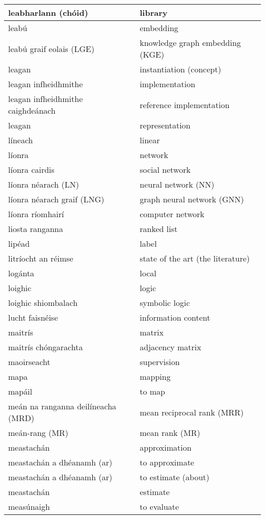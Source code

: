 \begin{longtable}{|l|l|}
		leabharlann (chóid)&library\\ \hline 
		leabú&embedding\\ \hline 
		leabú graif eolais (LGE)&knowledge graph embedding (KGE)\\ \hline 
		leagan&instantiation (concept)\\ \hline 
		leagan infheidhmithe&implementation\\ \hline 
		leagan infheidhmithe caighdeánach&reference implementation\\ \hline 
		leagan&representation\\ \hline 
		líneach&linear\\ \hline 
		líonra&network\\ \hline 
		líonra cairdis&social network\\ \hline 
		líonra néarach (LN)&neural network (NN)\\ \hline 
		líonra néarach graif (LNG)&graph neural network (GNN)\\ \hline 
		líonra ríomhairí&computer network\\ \hline 
		liosta ranganna&ranked list\\ \hline 
		lipéad&label\\ \hline 
		litríocht an réimse&state of the art (the literature)\\ \hline 
		logánta&local\\ \hline 
		loighic&logic\\ \hline 
		loighic shiombalach&symbolic logic\\ \hline 
		lucht faisnéise&information content\\ \hline 
		maitrís&matrix\\ \hline 
		maitrís chóngarachta&adjacency matrix\\ \hline 
		maoirseacht&supervision\\ \hline 
		mapa&mapping\\ \hline 
		mapáil&to map\\ \hline 
		meán na ranganna deilíneacha (MRD)&mean reciprocal rank (MRR)\\ \hline 
		meán-rang (MR)&mean rank (MR)\\ \hline 
		meastachán&approximation\\ \hline 
		meastachán a dhéanamh (ar)&to approximate\\ \hline 
		meastachán a dhéanamh (ar)&to estimate (about)\\ \hline 
		meastachán&estimate\\ \hline 
		measúnaigh&to evaluate\\ \hline 

\end{longtable}
